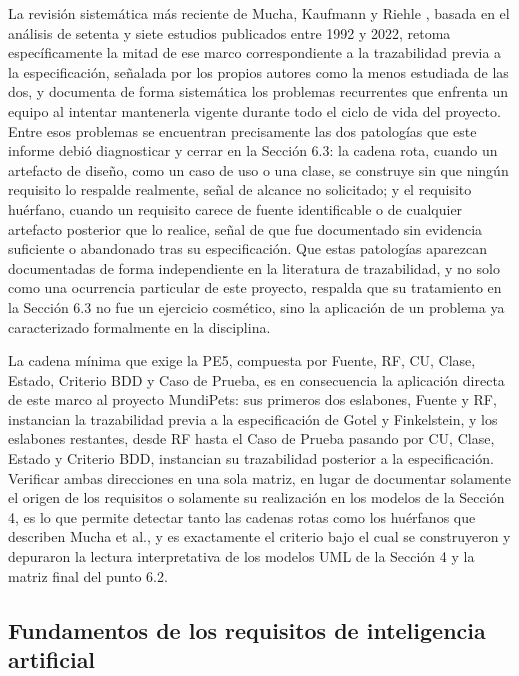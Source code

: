 \documentclass[journal,onecolumn]{IEEEtran}
\begin{document}
	La revisión sistemática más reciente de Mucha, Kaufmann y Riehle
	\cite{mucha2024}, basada en el análisis de setenta y siete estudios
	publicados entre 1992 y 2022, retoma específicamente la mitad de ese
	marco correspondiente a la trazabilidad previa a la especificación,
	señalada por los propios autores como la menos estudiada de las dos, y
	documenta de forma sistemática los problemas recurrentes que enfrenta un
	equipo al intentar mantenerla vigente durante todo el ciclo de vida del
	proyecto. Entre esos problemas se encuentran precisamente las dos
	patologías que este informe debió diagnosticar y cerrar en la Sección
	6.3: la cadena rota, cuando un artefacto de diseño, como un caso de uso
	o una clase, se construye sin que ningún requisito lo respalde
	realmente, señal de alcance no solicitado; y el requisito huérfano,
	cuando un requisito carece de fuente identificable o de cualquier
	artefacto posterior que lo realice, señal de que fue documentado sin
	evidencia suficiente o abandonado tras su especificación. Que estas
	patologías aparezcan documentadas de forma independiente en la
	literatura de trazabilidad, y no solo como una ocurrencia particular de
	este proyecto, respalda que su tratamiento en la Sección 6.3 no fue un
	ejercicio cosmético, sino la aplicación de un problema ya caracterizado
	formalmente en la disciplina.
	
	La cadena mínima que exige la PE5, compuesta por Fuente, RF, CU, Clase,
	Estado, Criterio BDD y Caso de Prueba, es en consecuencia la aplicación
	directa de este marco al proyecto MundiPets: sus primeros dos eslabones,
	Fuente y RF, instancian la trazabilidad previa a la especificación de
	Gotel y Finkelstein, y los eslabones restantes, desde RF hasta el Caso
	de Prueba pasando por CU, Clase, Estado y Criterio BDD, instancian su
	trazabilidad posterior a la especificación. Verificar ambas direcciones
	en una sola matriz, en lugar de documentar solamente el origen de los
	requisitos o solamente su realización en los modelos de la Sección 4, es
	lo que permite detectar tanto las cadenas rotas como los huérfanos que
	describen Mucha et al., y es exactamente el criterio bajo el cual se
	construyeron y depuraron la lectura interpretativa de los modelos UML de
	la Sección 4 y la matriz final del punto 6.2.
	
	\subsection*{Fundamentos de los requisitos de inteligencia artificial}
	
\end{document}
